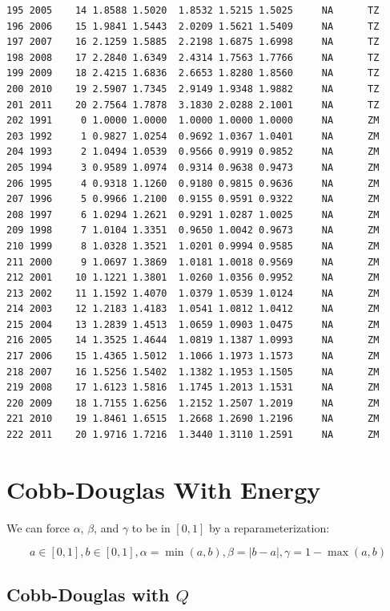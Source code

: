 \documentclass[preprint,authoryear,12pt]{elsarticle}\usepackage{graphicx, color}
\makeatletter
\newenvironment{kframe}{%
 \def\at@end@of@kframe{}%
 \ifinner\ifhmode%
  \def\at@end@of@kframe{\end{minipage}}%
  \begin{minipage}{\columnwidth}%
 \fi\fi%
 \def\FrameCommand##1{\hskip\@totalleftmargin \hskip-\fboxsep
 \colorbox{shadecolor}{##1}\hskip-\fboxsep
     \hskip-\linewidth \hskip-\@totalleftmargin \hskip\columnwidth}%
 \MakeFramed {\advance\hsize-\width
   \@totalleftmargin\z@ \linewidth\hsize
   \@setminipage}}%
 {\par\unskip\endMakeFramed%
 \at@end@of@kframe}
\newenvironment{knitrout}{}{} %
\makeatother
\begin{document}
\begin{knitrout}
\begin{kframe}
\begin{verbatim}
195 2005    14 1.8588 1.5020  1.8532 1.5215 1.5025     NA      TZ
196 2006    15 1.9841 1.5443  2.0209 1.5621 1.5409     NA      TZ
197 2007    16 2.1259 1.5885  2.2198 1.6875 1.6998     NA      TZ
198 2008    17 2.2840 1.6349  2.4314 1.7563 1.7766     NA      TZ
199 2009    18 2.4215 1.6836  2.6653 1.8280 1.8560     NA      TZ
200 2010    19 2.5907 1.7345  2.9149 1.9348 1.9882     NA      TZ
201 2011    20 2.7564 1.7878  3.1830 2.0288 2.1001     NA      TZ
202 1991     0 1.0000 1.0000  1.0000 1.0000 1.0000     NA      ZM
203 1992     1 0.9827 1.0254  0.9692 1.0367 1.0401     NA      ZM
204 1993     2 1.0494 1.0539  0.9566 0.9919 0.9852     NA      ZM
205 1994     3 0.9589 1.0974  0.9314 0.9638 0.9473     NA      ZM
206 1995     4 0.9318 1.1260  0.9180 0.9815 0.9636     NA      ZM
207 1996     5 0.9966 1.2100  0.9155 0.9591 0.9322     NA      ZM
208 1997     6 1.0294 1.2621  0.9291 1.0287 1.0025     NA      ZM
209 1998     7 1.0104 1.3351  0.9650 1.0042 0.9673     NA      ZM
210 1999     8 1.0328 1.3521  1.0201 0.9994 0.9585     NA      ZM
211 2000     9 1.0697 1.3869  1.0181 1.0018 0.9569     NA      ZM
212 2001    10 1.1221 1.3801  1.0260 1.0356 0.9952     NA      ZM
213 2002    11 1.1592 1.4070  1.0379 1.0539 1.0124     NA      ZM
214 2003    12 1.2183 1.4183  1.0541 1.0812 1.0412     NA      ZM
215 2004    13 1.2839 1.4513  1.0659 1.0903 1.0475     NA      ZM
216 2005    14 1.3525 1.4644  1.0819 1.1387 1.0993     NA      ZM
217 2006    15 1.4365 1.5012  1.1066 1.1973 1.1573     NA      ZM
218 2007    16 1.5256 1.5402  1.1382 1.1953 1.1505     NA      ZM
219 2008    17 1.6123 1.5816  1.1745 1.2013 1.1531     NA      ZM
220 2009    18 1.7155 1.6256  1.2152 1.2507 1.2019     NA      ZM
221 2010    19 1.8461 1.6515  1.2668 1.2690 1.2196     NA      ZM
222 2011    20 1.9716 1.7216  1.3440 1.3110 1.2591     NA      ZM
\end{verbatim}
\end{kframe}
\end{knitrout}


\section{Cobb-Douglas With Energy}

We can force $\alpha$, $\beta$, and $\gamma$ to be in $[0,1]$ by a reparameterization:

\[ a \in[0,1], b \in [0,1], \alpha=\min(a,b), \beta=|b-a|, \gamma = 1-\max(a,b) \]




\subsection{Cobb-Douglas with $Q$}
\end{document}

